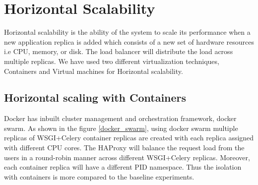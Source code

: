 \documentclass{iitbreport}
\begin{document}
\chapter{Horizontal Scalability} \label{horizontal_scalability}
Horizontal scalability is the ability of the system to scale its performance when a new application replica is added which consists of a new set of hardware resources i.e CPU, memory, or disk. The load balancer will distribute the load across multiple replicas. We have used two different virtualization techniques, Containers and Virtual machines for Horizontal scalability.
\section{Horizontal scaling with Containers}
Docker has inbuilt cluster management and orchestration framework, docker swarm. As shown in the figure \ref{docker_swarm}, using docker swarm multiple replicas of WSGI+Celery container replicas are created with each replica assigned with different CPU cores. The HAProxy will balance the request load from the users in a round-robin manner across different WSGI+Celery replicas. Moreover, each container replica will have a different PID namespace. Thus the isolation with containers is more compared to the baseline experiments. 
\end{document}
